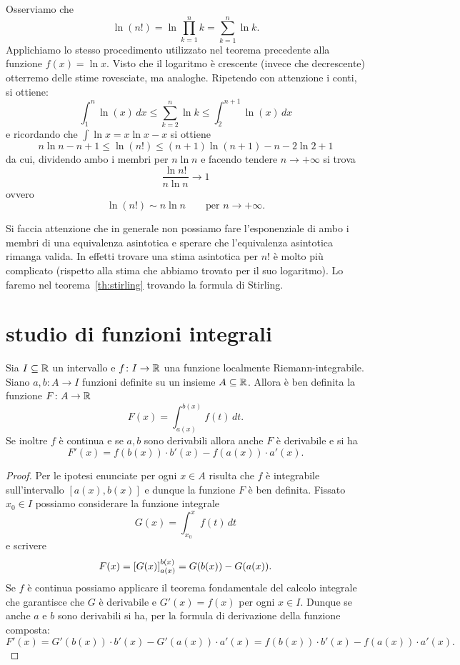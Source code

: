 \begin{example}
\label{ex:498124}%
%
%
Osserviamo che
\[
  \ln (n!) = \ln \prod_{k=1}^n k = \sum_{k=1}^n \ln k.
\]
Applichiamo lo stesso procedimento utilizzato nel teorema precedente alla
funzione $f(x) = \ln x$. Visto che il logaritmo è crescente
(invece che decrescente) otterremo delle stime rovesciate, ma analoghe.
 Ripetendo con attenzione i conti, si ottiene:
\[
    \int_1^n \ln(x)\, dx \le  \sum_{k=2}^n \ln k \le \int_2^{n+1} \ln(x) \, dx
\]
e ricordando che $\int \ln x = x \ln x - x$ si ottiene
\[
  n \ln n - n + 1 \le \ln(n!) \le (n+1) \ln (n+1) - n - 2\ln 2 + 1
\]
da cui, dividendo ambo i membri per $n \ln n$ e facendo tendere $n\to +\infty$ si trova
\[
 \frac{\ln n!}{n \ln n}\to 1
\]
ovvero
\[
  \ln (n!) \sim n \ln n \qquad \text{per $n\to +\infty$.}
\]

Si faccia attenzione che in generale non possiamo fare l'esponenziale di ambo i membri di una equivalenza asintotica
e sperare che l'equivalenza asintotica rimanga valida.
In effetti trovare una stima asintotica per $n!$ è molto più complicato (rispetto alla stima che abbiamo 
trovato per il suo logaritmo).
Lo faremo nel teorema~\ref{th:stirling} trovando la formula di Stirling.
\end{example}

\section{studio di funzioni integrali}

\begin{theorem}
Sia $I\subseteq {\mathbb R}$ un intervallo e $f\colon I \to {\mathbb R}$
una funzione localmente Riemann-integrabile.
Siano $a,b\colon A \to I$ funzioni definite
su un insieme $A \subseteq {\mathbb R}$.
Allora è ben definita la funzione $F\colon A \to {\mathbb R}$
\[
  F(x) = \int_{a(x)}^{b(x)} f(t)\, dt.
\]
Se inoltre $f$ è continua e se $a,b$ sono derivabili
allora anche $F$ è derivabile e si ha
\[
  F'(x) = f(b(x)) \cdot b'(x) - f(a(x)) \cdot a'(x).
\]
\end{theorem}
%
\begin{proof}
Per le ipotesi enunciate per ogni $x\in A$ risulta
che $f$ è integrabile sull'intervallo $[a(x),b(x)]$
e dunque la funzione $F$ è ben definita.
Fissato $x_0\in I$
possiamo considerare la funzione integrale
\[
  G(x) = \int_{x_0}^x f(t)\, dt
\]
e scrivere
\[
  F(x)
    = {\left[ G(x) \right]}_{a(x)}^{b(x)}
    = G(b(x)) - G(a(x)).
\]
Se $f$ è continua possiamo applicare il
teorema fondamentale del calcolo integrale
che garantisce che $G$ è derivabile e $G'(x) = f(x)$
per ogni $x\in I$. Dunque se anche $a$ e $b$
sono derivabili si ha, per la formula di derivazione
della funzione composta:
\[
F'(x)
= G'(b(x)) \cdot b'(x) - G'(a(x)) \cdot a'(x)
= f(b(x)) \cdot b'(x) - f(a(x)) \cdot a'(x).
\]
\end{proof}

